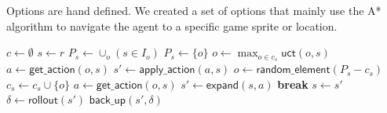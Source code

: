 Options are hand defined. We created a set of options that mainly use the A*
algorithm to navigate the agent to a specific game sprite or location.


\begin{algorithm}
	\caption{$\mathsf{O-MCTS}(r, max\_time, max\_depth)$}
	\label{alg:omcts}
	\begin{algorithmic}[1]
		\State $c \gets \emptyset$ 
		 \label{alg:omcts:mainloop}
			\State $s \gets r$ 
			 \label{alg:omcts:innerloop}
			 \label{alg:omcts:sp} 
				\State $P_s \gets \cup_o (s \in I_o)$ 
				\Else
					\State $P_s \gets \{o\}$ 
				\EndIf \label{alg:omcts:ep}
					\State $o \gets \max_{o \in c_s} \mathsf{uct}(o, s)$ \label{alg:omcts:uct} 
					\State $a \gets \mathsf{get\_action}(o, s)$ 
					\State $s' \gets \mathsf{apply\_action}(a, s)$ \label{alg:omcts:apply}
				\Else \label{alg:omcts:sexpand}
					\State $o \gets \mathsf{random\_element}(P_s - c_s)$ 
					\State $c_s \gets c_s \cup \{o\}$ 
					\State $a \gets \mathsf{get\_action}(o, s)$ 
					\State $s' \gets \mathsf{expand}(s, a)$ 
					\State \textbf{break} \label{alg:omcts:break}
				\EndIf \label{alg:omcts:eexpand}
				\State $s \gets s'$ \label{alg:omcts:ss} 
			\EndWhile
			\State $\delta \gets \mathsf{rollout}(s')$ \label{alg:omcts:rollout}
			\State $\mathsf{back\_up}(s', \delta)$ \label{alg:omcts:backup}
		\EndWhile
		\State {}
	\end{algorithmic}
\end{algorithm}

